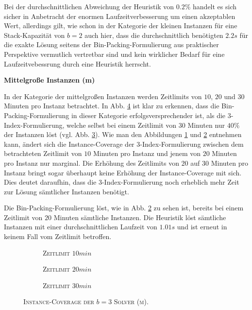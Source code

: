 Bei der durchschnittlichen Abweichung der Heuristik von $0.2 \%$ handelt es sich sicher in Anbetracht
der enormen Laufzeitverbesserung um einen akzeptablen Wert, allerdings gilt, wie schon in der Kategorie
der kleinen Instanzen für eine Stack-Kapazität von $b = 2$ auch hier, dass die durchschnittlich benötigten $2.2s$
für die exakte Lösung seitens der Bin-Packing-Formulierung aus praktischer Perspektive vermutlich vertretbar sind
und kein wirklicher Bedarf für eine Laufzeitvebessrung durch eine Heuristik herrscht.

\textbf{Mittelgroße Instanzen (m)}

In der Kategorie der mittelgroßen Instanzen werden Zeitlimits von $10$, $20$ und $30$ Minuten pro Instanz betrachtet.
In Abb. \ref{fig:instance_coverage_b=3_m} ist klar zu erkennen, dass die Bin-Packing-Formulierung in dieser Kategorie erfolgsversprechender ist, als die 3-Index-Formulierung, welche selbst bei einem Zeitlimit von $30$ Minuten nur $40 \%$ der Instanzen löst (vgl. Abb. \ref{fig:instance_coverage_b=3_m_c}).
Wie man den Abbildungen \ref{fig:instance_coverage_b=3_m_a} und \ref{fig:instance_coverage_b=3_m_b} entnehmen kann,
ändert sich die Instance-Coverage der 3-Index-Formulierung zwischen dem betrachteten Zeitlimit von $10$ Minuten pro
Instanz und jenem von $20$ Minuten pro Instanz nur marginal.
Die Erhöhung des Zeitlimits von $20$ auf $30$ Minuten pro Instanz bringt sogar überhaupt keine Erhöhung der Instance-Coverage
mit sich. Dies deutet daraufhin, dass die 3-Index-Formulierung noch erheblich mehr Zeit zur Lösung sämtlicher Instanzen benötigt.

Die Bin-Packing-Formulierung löst, wie in Abb. \ref{fig:instance_coverage_b=3_m_b} zu sehen
ist, bereits bei einem Zeitlimit von $20$ Minuten sämtliche Instanzen.
Die Heuristik löst sämtliche Instanzen mit einer durchschnittlichen Laufzeit von $1.01s$ und ist erneut
in keinem Fall vom Zeitlimit betroffen.

\begin{figure}[H]
\centering

\begin{subfigure}[b]{0.3\textwidth}
\centering
\caption{\textsc{Zeitlimit} $10min$}
\label{fig:instance_coverage_b=3_m_a}
\end{subfigure}
\hfill
\begin{subfigure}[b]{0.3\textwidth}
\centering
\caption{\textsc{Zeitlimit} $20min$}
\label{fig:instance_coverage_b=3_m_b}
\end{subfigure}
\hfill
\begin{subfigure}[b]{0.3\textwidth}
\centering
\caption{\textsc{Zeitlimit} $30min$}
\label{fig:instance_coverage_b=3_m_c}
\end{subfigure}
\caption{\textsc{Instance-Coverage der $b = 3$ Solver (m)}.}
\label{fig:instance_coverage_b=3_m}
\end{figure}

